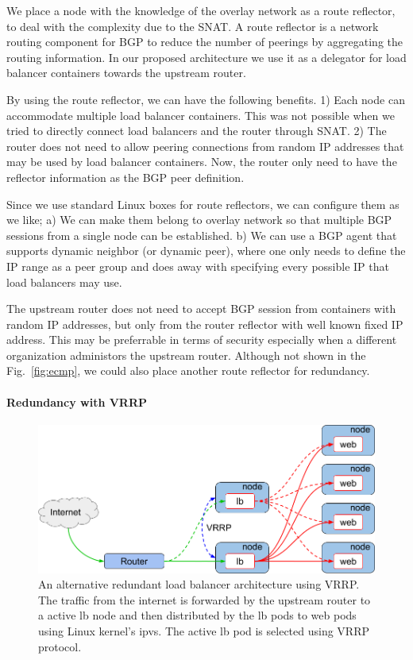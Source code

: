%
We place a node with the knowledge of the overlay network as a route reflector, to deal with the complexity due to the SNAT.
A route reflector is a network routing component for BGP to reduce the number of peerings by aggregating the routing information\cite{rfc4456}.
In our proposed architecture we use it as a delegator for load balancer containers towards the upstream router.

By using the route reflector, we can have the following benefits.
1) Each node can accommodate multiple load balancer containers. This was not possible when we tried to directly connect load balancers and the router through SNAT.
2) The router does not need to allow peering connections from random IP addresses that may be used by load balancer containers. Now, the router only need to have the reflector information as the BGP peer definition.

Since we use standard Linux boxes for route reflectors, we can configure them as we like;
a) We can make them belong to overlay network so that multiple BGP sessions from a single node can be established.
b) We can use a BGP agent that supports dynamic neighbor (or dynamic peer), where one only needs to define the IP range as a peer group and does away with specifying every possible IP that load balancers may use.

The upstream router does not need to accept BGP session from containers with random IP addresses, but only from the router reflector with well known fixed IP address. This may be preferrable in terms of security especially when a different organization administors the upstream router.
Although not shown in the Fig.~\ref{fig:ecmp}, we could also place another route reflector for redundancy.


\paragraph{\bf Redundancy with VRRP}\label{Redundancy with VRRP}

\begin{figure}[tb]
\begin{center}
\includegraphics[width=\columnwidth]{Figs/vrrp.png}
\end{center}
\caption{
  An alternative redundant load balancer architecture using VRRP. \\ %
  The traffic from the internet is forwarded by the upstream router to a active lb node and then distributed by the lb pods to web pods using Linux kernel's ipvs.
  The active lb pod is selected using VRRP protocol.
}
\label{fig:vrrp}
\end{figure}

